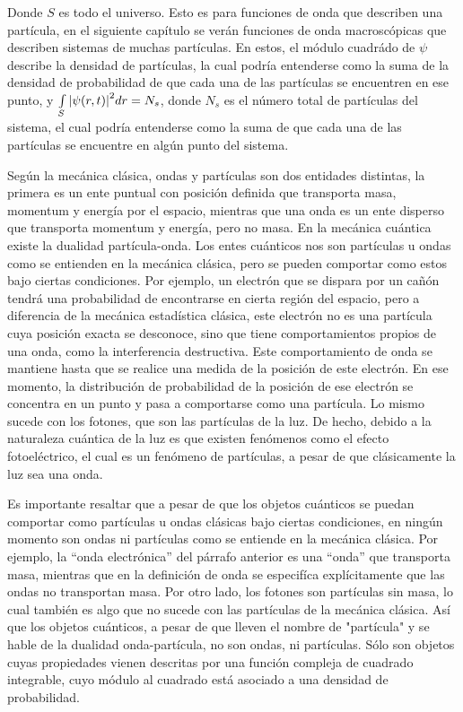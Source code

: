 Donde $S$ es todo el universo. Esto es para funciones de onda que describen una partícula, en el siguiente capítulo se verán funciones de onda macroscópicas que describen sistemas de muchas partículas. En estos, el módulo cuadrádo de $\psi$ describe la densidad de partículas, la cual podría entenderse como la suma de la densidad de probabilidad de que cada una de las partículas se encuentren en ese punto, y $\int\limits_S \abs{\psi(r,t)}^2 dr = N_s$, donde $N_s$ es el número total de partículas del sistema, el cual podría entenderse como la suma de que cada una de las partículas se encuentre en algún punto del sistema.

Según la mecánica clásica, ondas y partículas son dos entidades distintas, la primera es un ente puntual con posición definida que transporta masa, momentum y energía por el espacio, mientras que una onda es un ente disperso que transporta momentum y energía, pero no masa. En la mecánica cuántica existe la dualidad partícula-onda. Los entes cuánticos nos son partículas u ondas como se entienden en la mecánica clásica, pero se pueden comportar como estos bajo ciertas condiciones. Por ejemplo, un electrón que se dispara por un cañón tendrá una probabilidad de encontrarse en cierta región del espacio, pero a diferencia de la mecánica estadística clásica, este electrón no es una partícula cuya posición exacta se desconoce, sino que tiene comportamientos propios de una onda, como la interferencia destructiva. Este comportamiento de onda se mantiene hasta que se realice una medida de la posición de este electrón. En ese momento, la distribución de probabilidad de la posición de ese electrón se concentra en un punto y pasa a comportarse como una partícula. Lo mismo sucede con los fotones, que son las partículas de la luz. De hecho, debido a la naturaleza cuántica de la luz es que existen fenómenos como el efecto fotoeléctrico, el cual es un fenómeno de partículas, a pesar de que clásicamente la luz sea una onda.

Es importante resaltar que a pesar de que los objetos cuánticos se puedan comportar como partículas u ondas clásicas bajo ciertas condiciones, en ningún momento son ondas ni partículas como se entiende en la mecánica clásica. Por ejemplo, la ``onda electrónica'' del párrafo anterior es una ``onda'' que transporta masa, mientras que en la definición de onda se especifíca explícitamente que las ondas no transportan masa. Por otro lado, los fotones son partículas sin masa, lo cual también es algo que no sucede con las partículas de la mecánica clásica. Así que los objetos cuánticos, a pesar de que lleven el nombre de "partícula" y se hable de la dualidad onda-partícula, no son ondas, ni partículas. Sólo son objetos cuyas propiedades vienen descritas por una función compleja de cuadrado integrable, cuyo módulo al cuadrado está asociado a una densidad de probabilidad.

